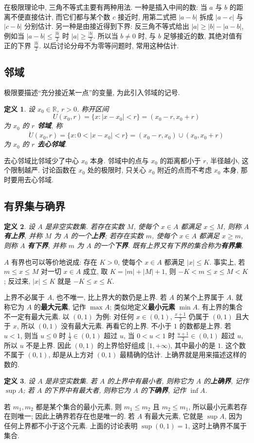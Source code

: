 \documentclass[UTF8,openany]{ctexbook}
\theoremstyle{chinesetextbook}
\newtheorem{definition}{定义}[section]
\begin{document}
在极限理论中, 三角不等式主要有两种用法. 一种是插入中间的数: 当 $a$ 与 $b$ 的距离不便直接估计, 而它们都与某个数 $c$ 接近时, 用第二式把 $|a-b|$ 拆成 $|a-c|$ 与 $|c-b|$ 分别估计. 另一种是由接近得到下界: 反三角不等式给出 $|a|\ge|b|-|a-b|$, 例如当 $\displaystyle|a-b|\le\frac{|b|}2$ 时 $\displaystyle|a|\ge\frac{|b|}2$. 所以当 $b\ne0$ 时, 与 $b$ 足够接近的数, 其绝对值有正的下界 $\displaystyle\frac{|b|}2$. 以后讨论分母不为零等问题时, 常用这种估计.
\subsection{邻域}
极限要描述“充分接近某一点”的变量, 为此引入邻域的记号.
\begin{definition}
设 $x_0\in\mathbb R$, $r>0$. 称开区间
\[
U(x_0,r)=\{x:|x-x_0|<r\}=(x_0-r,x_0+r)
\]
为 $x_0$ 的 \textbf{$r$ 邻域}, 称
\[
\mathring U(x_0,r)=\{x:0<|x-x_0|<r\}=(x_0-r,x_0)\cup(x_0,x_0+r)
\]
为 $x_0$ 的 \textbf{$r$ 去心邻域}.
\end{definition}
去心邻域比邻域少了中心 $x_0$ 本身. 邻域中的点与 $x_0$ 的距离都小于 $r$, 半径越小, 这个限制越严. 讨论函数在 $x_0$ 处的极限时, 只关心 $x_0$ 附近的点而不考虑 $x_0$ 本身, 那时要用去心邻域.
\subsection{有界集与确界}
\begin{definition}
设 $A$ 是非空实数集. 若存在实数 $M$, 使每个 $x\in A$ 都满足 $x\le M$, 则称 $A$ \textbf{有上界}, 并称 $M$ 为 $A$ 的一个\textbf{上界}; 若存在实数 $m$, 使每个 $x\in A$ 都满足 $x\ge m$, 则称 $A$ \textbf{有下界}, 并称 $m$ 为 $A$ 的一个\textbf{下界}. 既有上界又有下界的集合称为\textbf{有界集}.
\end{definition}
$A$ 有界也可以等价地说成: 存在 $K>0$, 使每个 $x\in A$ 都满足 $|x|\le K$. 事实上, 若 $m\le x\le M$ 对一切 $x\in A$ 成立, 取 $K=|m|+|M|+1$, 则 $-K<m\le x\le M<K$; 反过来, $|x|\le K$ 就是 $-K\le x\le K$.

上界不必属于 $A$, 也不唯一, 比上界大的数仍是上界. 若 $A$ 的某个上界属于 $A$, 就称它为 $A$ 的\textbf{最大元素}, 记作 $\max A$; 类似地定义\textbf{最小元素} $\min A$. 有上界的集合不一定有最大元素. 以 $(0,1)$ 为例: 对任何 $x\in(0,1)$, $\displaystyle\frac{x+1}2$ 仍属于 $(0,1)$ 且大于 $x$, 所以 $(0,1)$ 没有最大元素. 再看它的上界. 不小于 $1$ 的数都是上界. 若 $u<1$, 则当 $u\le0$ 时 $\displaystyle\frac12\in(0,1)$ 超过 $u$, 当 $0<u<1$ 时 $\displaystyle\frac{u+1}2\in(0,1)$ 超过 $u$, 所以 $u$ 不是上界. 因此 $(0,1)$ 的上界恰好组成 $[1,+\infty)$, 其中最小的是 $1$. 这个数不属于 $(0,1)$, 却是从上方对 $(0,1)$ 最精确的估计. 上确界就是用来描述这样的数的.
\begin{definition}
设 $A$ 是非空实数集. 若 $A$ 的上界中有最小者, 则称它为 $A$ 的\textbf{上确界}, 记作 $\sup A$; 若 $A$ 的下界中有最大者, 则称它为 $A$ 的\textbf{下确界}, 记作 $\inf A$.
\end{definition}
若 $m_1,m_2$ 都是某个集合的最小元素, 则 $m_1\le m_2$ 且 $m_2\le m_1$, 所以最小元素若存在则唯一; 因此上确界若存在也是唯一的. 若 $A$ 有最大元素, 它就是 $\sup A$, 因为任何上界都不小于这个元素. 上面的讨论表明 $\sup(0,1)=1$, 这时上确界不属于集合.
\end{document}
